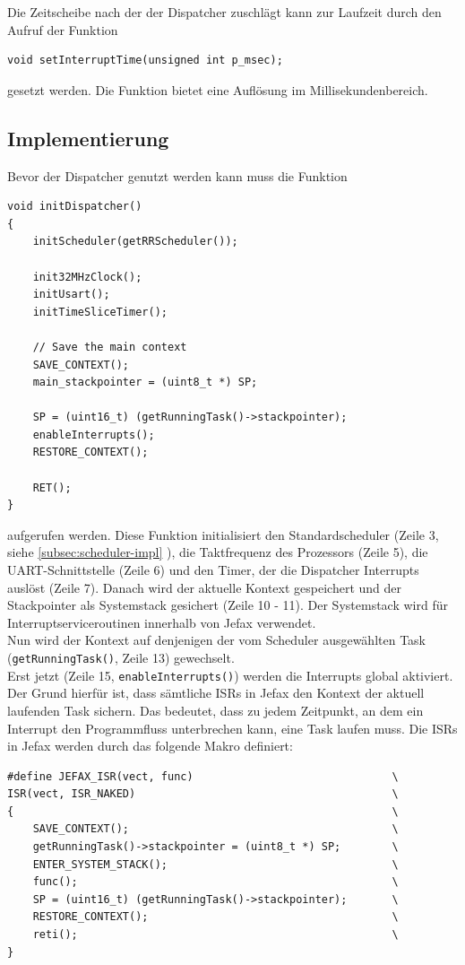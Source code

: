 \documentclass[fontsize=12pt, toc=bibliography, notitlepage]{scrreprt}
\newcommand{\refnn}[1]{\ref{#1} \nameref{#1}}
\begin{document}
Die Zeitscheibe nach der der Dispatcher zuschlägt kann zur Laufzeit durch den Aufruf der Funktion 

\begin{lstlisting}
void setInterruptTime(unsigned int p_msec);
\end{lstlisting}

gesetzt werden. Die Funktion bietet eine Auflösung im Millisekundenbereich.

\subsection{Implementierung}
\label{subsec:dispatcher-impl}
Bevor der Dispatcher genutzt werden kann muss die Funktion

\begin{lstlisting}[title=dispatcher.c]
void initDispatcher()
{
	initScheduler(getRRScheduler());
	
	init32MHzClock();
	initUsart();
	initTimeSliceTimer();
	
	// Save the main context
	SAVE_CONTEXT();
	main_stackpointer = (uint8_t *) SP;
	
	SP = (uint16_t) (getRunningTask()->stackpointer);
	enableInterrupts();
	RESTORE_CONTEXT();
	
	RET();
}
\end{lstlisting}

aufgerufen werden. Diese Funktion initialisiert den Standardscheduler (Zeile 3, siehe \refnn{subsec:scheduler-impl}), die Taktfrequenz des Prozessors (Zeile 5), die UART-Schnittstelle (Zeile 6) und den Timer, der die Dispatcher Interrupts auslöst (Zeile 7). Danach wird der aktuelle Kontext gespeichert und der Stackpointer als Systemstack gesichert (Zeile 10 - 11). Der Systemstack wird für Interruptserviceroutinen innerhalb von Jefax verwendet.\\
Nun wird der Kontext auf denjenigen der vom Scheduler ausgewählten Task (\lstinline$getRunningTask()$, Zeile 13) gewechselt.\\
Erst jetzt (Zeile 15, \lstinline$enableInterrupts()$) werden die Interrupts global aktiviert. Der Grund hierfür ist, dass sämtliche ISRs in Jefax den Kontext der aktuell laufenden Task sichern. Das bedeutet, dass zu jedem Zeitpunkt, an dem ein Interrupt den Programmfluss unterbrechen kann, eine Task laufen muss. Die ISRs in Jefax werden durch das folgende Makro definiert:

\begin{lstlisting}[title=interrupt.h]
#define JEFAX_ISR(vect, func)								\
ISR(vect, ISR_NAKED)										\
{															\
	SAVE_CONTEXT();											\
	getRunningTask()->stackpointer = (uint8_t *) SP;		\
	ENTER_SYSTEM_STACK();									\
	func();													\
	SP = (uint16_t) (getRunningTask()->stackpointer);		\
	RESTORE_CONTEXT();										\
	reti();													\
}
\end{lstlisting}
\end{document}
